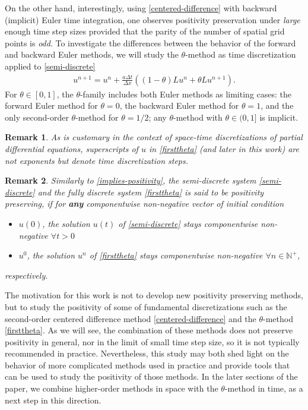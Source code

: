 \documentclass[a4paper]{article}
\newtheorem{remark}{Remark}
\newcommand{\dt}{\Delta t}
\newcommand{\dx}{\Delta x}
\newcommand{\te}{\theta}
\begin{document}
On the other hand, interestingly, using \eqref{centered-difference} with backward (implicit) 
Euler time integration, one 
observes positivity preservation
under \emph{large} enough time step sizes provided that the parity of the number of spatial grid points is \emph{odd}.  To investigate the differences between the behavior
of the forward and backward Euler methods, we will study the $\theta$-method 
\cite[Chapter IV.3]{hairerwanner} as time discretization applied to \eqref{semi-discrete}
\begin{align}\label{firsttheta}
    u^{n+1} = u^n + \frac{a\dt}{\dx}((1-\theta)Lu^n + \theta Lu^{n+1}).
\end{align}
For $\te\in[0,1]$, the $\theta$-family includes both Euler methods as limiting cases: the forward Euler method for $\te=0$, the backward 
 Euler method for $\te=1$, and the only second-order $\te$-method for $\te=1/2$; 
 any $\theta$-method with $\theta\in(0,1]$ is implicit.
 \begin{remark}
As is customary in the context of space-time discretizations of partial differential equations, superscripts of $u$ in \eqref{firsttheta} (and later in this work) are not exponents but denote time discretization steps.
\end{remark}
\begin{remark}
Similarly to \eqref{implies-positivity}, the semi-discrete system \eqref{semi-discrete} and the fully discrete system \eqref{firsttheta} is said to be \emph{positivity preserving}, if for \textbf{any} componentwise non-negative vector of initial condition 
\begin{itemize}
\item $u(0)$, the solution $u(t)$ of \eqref{semi-discrete} stays componentwise non-negative $\forall t>0$
\item $u^0$, the solution $u^n$ of \eqref{firsttheta} stays componentwise non-negative $\forall n\in\mathbb{N}^+$,
\end{itemize}
respectively.
\end{remark}

The motivation for this work is not to develop new positivity preserving
methods, but to study the positivity of some of fundamental discretizations
such as the second-order centered difference method \eqref{centered-difference} and the
$\theta$-method \eqref{firsttheta}.  As we will see, the combination of
these methods does not preserve positivity in general, nor in the limit
of small time step size, so it is not typically recommended in practice.
Nevertheless, this study may both shed light on the
behavior of more complicated methods used in practice and provide tools
that can be used to study the positivity of those methods.
In the later sections of the paper, we combine higher-order methods in space with the $\theta$-method in time, as a next step in this direction.
\end{document}
